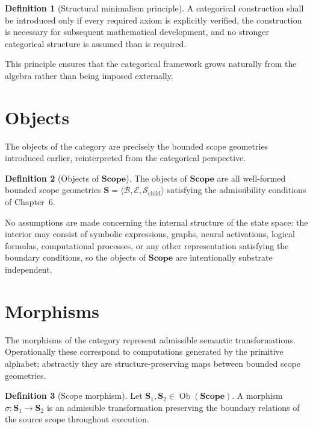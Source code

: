 \documentclass[11pt,twoside,openright]{book}
\numberwithin{equation}{chapter}
\theoremstyle{definition}
\newtheorem{definition}{Definition}[chapter]
\theoremstyle{plain}
\theoremstyle{remark}
\theoremstyle{definition}
\newcommand{\CatScope}{\mathbf{Scope}}
\newcommand{\Scope}{\mathbf{S}}
\newcommand{\ScopeMorph}{\sigma}
\newcommand{\Boundary}{\mathcal{B}}
\newcommand{\Interior}{\mathcal{E}}
\newcommand{\Children}{\mathcal{S}_{\mathrm{child}}}
\DeclareMathOperator{\Obj}{Ob}
\begin{document}
\begin{definition}[Structural minimalism principle]
A categorical construction shall be introduced only if every required
axiom is explicitly verified, the construction is necessary for
subsequent mathematical development, and no stronger categorical
structure is assumed than is required.
\end{definition}

This principle ensures that the categorical framework grows naturally
from the algebra rather than being imposed externally.

\section{Objects}

The objects of the category are precisely the bounded scope geometries
introduced earlier, reinterpreted from the categorical perspective.

\begin{definition}[Objects of $\CatScope$]
The objects of $\CatScope$ are all well-formed bounded scope geometries
$\Scope=\langle\Boundary,\Interior,\Children\rangle$ satisfying the
admissibility conditions of Chapter~6.
\end{definition}

No assumptions are made concerning the internal structure of the state
space: the interior may consist of symbolic expressions, graphs, neural
activations, logical formulas, computational processes, or any other
representation satisfying the boundary conditions, so the objects of
$\CatScope$ are intentionally substrate independent.

\section{Morphisms}

The morphisms of the category represent admissible semantic
transformations. Operationally these correspond to computations generated
by the primitive alphabet; abstractly they are structure-preserving maps
between bounded scope geometries.

\begin{definition}[Scope morphism]
Let $\Scope_1,\Scope_2\in\Obj(\CatScope)$. A morphism
$\ScopeMorph:\Scope_1\to\Scope_2$ is an admissible transformation preserving
the boundary relations of the source scope throughout execution.
\end{definition}
\end{document}
